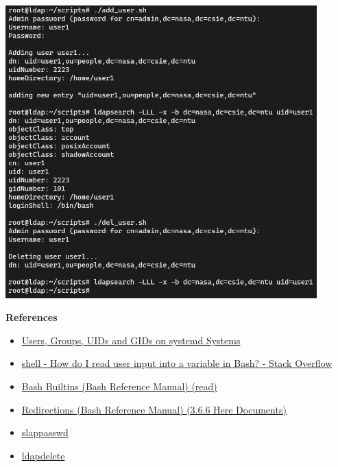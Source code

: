 \documentclass[12pt, a4paper]{article}
\begin{document}
  \includegraphics[width=0.9\textwidth]{4_result.png}

  \textbf{References}
  \begin{itemize}
    \item \href{https://systemd.io/UIDS-GIDS/}{Users, Groups, UIDs and GIDs on systemd Systems}
    \item \href{https://stackoverflow.com/questions/18544359/how-do-i-read-user-input-into-a-variable-in-bash}{shell - How do I read user input into a variable in Bash? - Stack Overflow}
    \item \href{https://www.gnu.org/software/bash/manual/html_node/Bash-Builtins.html#index-read}{Bash Builtins (Bash Reference Manual) (read)}
    \item \href{https://www.gnu.org/software/bash/manual/html_node/Redirections.html#Here-Documents}{Redirections (Bash Reference Manual) (3.6.6 Here Documents)}
    \item \href{https://www.openldap.org/software/man.cgi?query=slappasswd&apropos=0&sektion=0&manpath=OpenLDAP+2.6-Release&arch=default&format=html}{slappasswd}
    \item \href{https://www.openldap.org/software/man.cgi?query=ldapdelete&apropos=0&sektion=0&manpath=OpenLDAP+2.6-Release&arch=default&format=html}{ldapdelete}
  \end{itemize}
\end{document}
